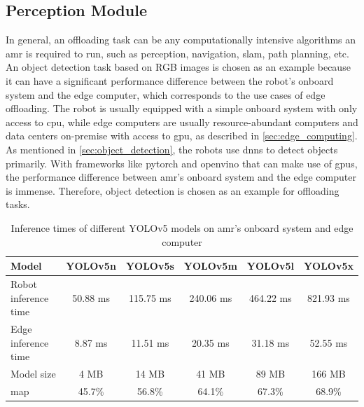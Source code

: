 \subsection{Perception Module}


In general, an offloading task can be any computationally intensive algorithms an \gls{amr} is required to run, such as perception, navigation, \gls{slam}, path planning, etc. An object detection task based on RGB images is chosen as an example because it can have a significant performance difference between the robot's onboard system and the edge computer, which corresponds to the use cases of edge offloading. The robot is usually equipped with a simple onboard system with only access to \gls{cpu}, while edge computers are usually resource-abundant computers and data centers on-premise with access to \gls{gpu}, as described in \cref{sec:edge_computing}. As mentioned in \cref{sec:object_detection}, the robots use \glspl{dnn} to detect objects primarily. With frameworks like \gls{pytorch} and \gls{openvino} that can make use of \glspl{gpu}, the performance difference between \gls{amr}'s onboard system and the edge computer is immense. Therefore, object detection is chosen as an example for offloading tasks. 

\begin{table}[htb]%
    \centering%
    \begin{tabular}{lccccc}
        \toprule
        Model &                     YOLOv5n &   YOLOv5s &   YOLOv5m &   YOLOv5l &   YOLOv5x \\
        \midrule
        Robot inference time &      50.88 ms &  115.75 ms & 240.06 ms & 464.22 ms & 821.93 ms  \\
        Edge inference time &       8.87 ms &   11.51 ms &  20.35 ms &  31.18 ms &  52.55 ms  \\
        Model size \cite{Jocher2022} &                4 MB &      14 MB &     41 MB &     89 MB &     166 MB    \\
        \acrshort{map} \cite{Jocher2022} &                 45.7\% &    56.8\% &    64.1\% &    67.3\% &    68.9\%  \\
        \bottomrule
    \end{tabular}
    \caption{Inference times of different YOLOv5 models on \acrshort{amr}'s onboard system and edge computer}
    \label{tab:inference_time}%
\end{table}

